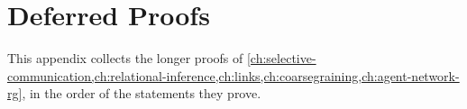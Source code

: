 \chapter{Deferred Proofs}
\label{app:deferred-proofs}

This appendix collects the longer proofs of \cref{ch:selective-communication,ch:relational-inference,ch:links,ch:coarsegraining,ch:agent-network-rg}, in the order of the statements they prove.






